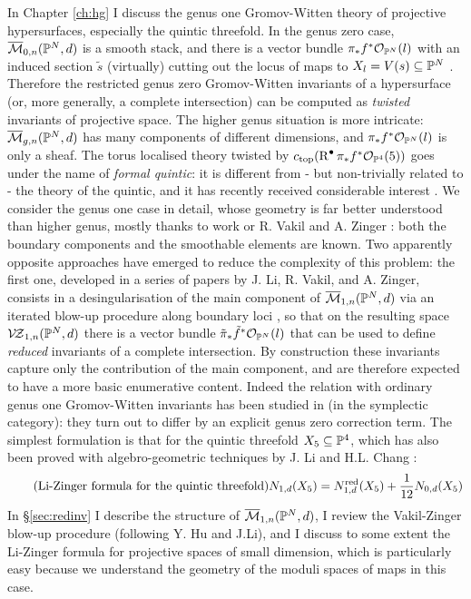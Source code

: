 In Chapter \ref{ch:hg} I discuss the genus one Gromov-Witten theory of projective hypersurfaces, especially the quintic threefold. In the genus zero case, $\overline{\mathcal{M}}_{0,n}(\mathbb P^N,d)$ is a smooth stack, and there is a vector bundle $\pi_*f^*\mathcal{O}_{\mathbb P^N}(l)$ with an induced section $\tilde{s}$ (virtually) cutting out the locus of maps to $X_l=V(s)\subseteq \mathbb P^N$ \cite{CKL}. Therefore the restricted genus zero Gromov-Witten invariants of a hypersurface (or, more generally, a complete intersection) can be computed as \emph{twisted} invariants of projective space. The higher genus situation is more intricate: $\overline{\mathcal{M}}_{g,n}(\mathbb P^N,d)$ has many components of different dimensions, and $\pi_*f^*\mathcal{O}_{\mathbb P^N}(l)$ is only a sheaf. The torus localised theory twisted by $c_{\rm{top}}(\operatorname{R}^{\bullet}\pi_*f^*\mathcal{O}_{\mathbb P^4}(5))$ goes under the name of \emph{formal quintic}: it is different from - but non-trivially related to - the theory of the quintic, and it has recently received considerable interest \cites{LhoPandha,GJR}. We consider the genus one case in detail, whose geometry is far better understood than higher genus, mostly thanks to work or R. Vakil and A. Zinger \cites{Vre,VZpreview}: both the boundary components and the smoothable elements are known. Two apparently opposite approaches have emerged to reduce the complexity of this problem: the first one, developed in a series of papers by J. Li, R. Vakil, and A. Zinger, consists in a desingularisation of the main component of $\overline{\mathcal{M}}_{1,n}(\mathbb P^N,d)$ via an iterated blow-up procedure along boundary loci \cites{VZ,HL}, so that on the resulting space $\mathcal{V\!Z}_{1,n}(\mathbb P^N,d)$ there is a vector bundle $\tilde{\pi}_*\tilde{f}^*\mathcal{O}_{\mathbb P^N}(l)$ that can be used to define \emph{reduced} invariants of a complete intersection. By construction these invariants capture only the contribution of the main component, and are therefore expected to have a more basic enumerative content. Indeed the relation with ordinary genus one Gromov-Witten invariants has been studied in \cites{LZ,zingerstvsred} (in the symplectic category): they turn out to differ by an explicit genus zero correction term. The simplest formulation is that for the quintic threefold $X_5\subseteq\mathbb P^4$, which has also been proved with algebro-geometric techniques by J. Li and H.L. Chang \cite{CL}:
\begin{equation}\tag{Li-Zinger formula for the quintic threefold}
 N_{1,d}(X_5)=N_{1,d}^{\rm{red}}(X_5)+\frac{1}{12}N_{0,d}(X_5)
\end{equation}
In \S \ref{sec:redinv} I describe the structure of $\overline{\mathcal{M}}_{1,n}(\mathbb P^N,d)$, I review the Vakil-Zinger blow-up procedure (following Y. Hu and J.Li), and I discuss to some extent the Li-Zinger formula for projective spaces of small dimension, which is particularly easy because we understand the geometry of the moduli spaces of maps in this case.

